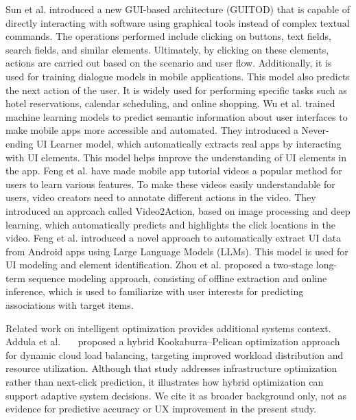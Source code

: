 \documentclass[sn-mathphys-num, Numbered]{sn-jnl}%
\theoremstyle{thmstyleone}%
\theoremstyle{thmstyletwo}%
\theoremstyle{thmstylethree}%
\providecommand{\DIFadd}[1]{{\protect\color{green!40!black}#1}} %
\providecommand{\DIFdel}[1]{}                      %
\providecommand{\DIFaddbegin}{} %
\providecommand{\DIFaddend}{} %
\providecommand{\DIFdelbegin}{} %
\providecommand{\DIFdelend}{} %
\newcommand{\DIFscaledelfig}{0.5}
\newlength{\DIFdelgraphicswidth} %
\newlength{\DIFdelgraphicsheight} %
\newcommand{\DIFaddincludegraphics}[2][]{{\color{blue}\fbox{\DIFOincludegraphics[#1]{#2}}}} %
\newcommand{\DIFdelincludegraphics}[2][]{%
\sbox{\DIFdelgraphicsbox}{\DIFOincludegraphics[#1]{#2}}%
\settoboxwidth{\DIFdelgraphicswidth}{\DIFdelgraphicsbox} %
\settoboxtotalheight{\DIFdelgraphicsheight}{\DIFdelgraphicsbox} %
\scalebox{\DIFscaledelfig}{%
\parbox[b]{\DIFdelgraphicswidth}{\usebox{\DIFdelgraphicsbox}\\[-\baselineskip] \rule{\DIFdelgraphicswidth}{0em}}\llap{\resizebox{\DIFdelgraphicswidth}{\DIFdelgraphicsheight}{%
\setlength{\unitlength}{\DIFdelgraphicswidth}%
\begin{picture}(1,1)%
\thicklines\linethickness{2pt} %
{\color[rgb]{1,0,0}\put(0,0){\framebox(1,1){}}}%
{\color[rgb]{1,0,0}\put(0,0){\line( 1,1){1}}}%
{\color[rgb]{1,0,0}\put(0,1){\line(1,-1){1}}}%
\end{picture}%
}\hspace*{3pt}}} %
} %
\DeclareRobustCommand{\DIFaddbegin}{\DIFOaddbegin \let\includegraphics\DIFaddincludegraphics} %
\DeclareRobustCommand{\DIFaddend}{\DIFOaddend \let\includegraphics\DIFOincludegraphics} %
\DeclareRobustCommand{\DIFdelbegin}{\DIFOdelbegin \let\includegraphics\DIFdelincludegraphics} %
\DeclareRobustCommand{\DIFdelend}{\DIFOaddend \let\includegraphics\DIFOincludegraphics} %
\begin{document}
Sun et al. \cite{sun2022meta} introduced a new GUI-based architecture (GUITOD) that is capable of directly interacting with software using graphical tools instead of complex textual commands. The operations performed include clicking on buttons, text fields, search fields, and similar elements. Ultimately, by clicking on these elements, actions are carried out based on the scenario and user flow. Additionally, it is used for training dialogue models in mobile applications. This model also predicts the next action of the user. It is widely used for performing specific tasks such as hotel reservations, calendar scheduling, and online shopping. Wu et al.\cite{wu2023never} trained machine learning models to predict semantic information about user interfaces to make mobile apps more accessible and automated. They introduced a Never-ending UI Learner model, which automatically extracts real apps by interacting with UI elements. This model helps improve the understanding of UI elements in the app. Feng et al.\cite{feng2023video2action} have made mobile app tutorial videos a popular method for users to learn various features. To make these videos easily understandable for users, video creators need to annotate different actions in the video. They introduced an approach called Video2Action, based on image processing and deep learning, which automatically predicts and highlights the click locations in the video. Feng et al.\cite{feng2024mud} introduced a novel approach to automatically extract UI data from Android apps using Large Language Models (LLMs). This model is used for UI modeling and element identification. Zhou et al.\cite{zhou2024encode} proposed a two-stage long-term sequence modeling approach, consisting of offline extraction and online inference, which is used to familiarize with user interests for predicting associations with target items.

\DIFdelbegin \DIFdel{As reviewed in our Related Work section, none of the prior studies?including Baeza-Yates }\DIFdelend \DIFaddbegin \DIFadd{Related work on intelligent optimization provides additional systems context. Addula }\DIFaddend et al.\DIFdelbegin \DIFdel{\mbox{%
\cite{bohmer2011falling}}\hskip0pt%
, Yang et al. \mbox{%
\cite{yang2020measuring}}\hskip0pt%
, Sun }\DIFdelend \DIFaddbegin \DIFadd{~\mbox{%
\cite{addula2024kookaburra} }\hskip0pt%
proposed a hybrid Kookaburra--Pelican optimization approach for dynamic cloud load balancing, targeting improved workload distribution and resource utilization. Although that study addresses infrastructure optimization rather than next-click prediction, it illustrates how hybrid optimization can support adaptive system decisions. We cite it as broader background only, not as evidence for predictive accuracy or UX improvement in the present study.
}
\end{document}
